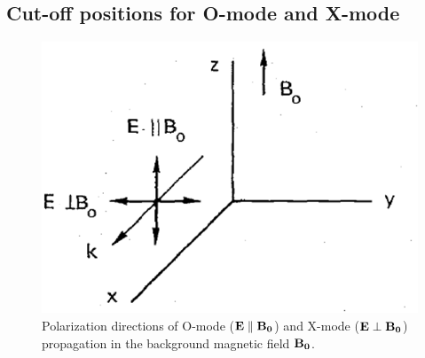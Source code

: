 \subsection{Cut-off positions for O-mode and X-mode}


\begin{figure}[h]
\begin{centering}
\includegraphics[scale=0.5]{polarization.png}
\par\end{centering}
\caption[Polarization directions of O-mode and X-mode]{Polarization directions of O-mode ($\boldsymbol{\mathrm{E}}\parallel\boldsymbol{\mathrm{B_0}}$) and X-mode ($\boldsymbol{\mathrm{E}}\perp\boldsymbol{\mathrm{B_0}}$) propagation in the background magnetic field $\boldsymbol{\mathrm{B_0}}$.}
\label{fig:polarization}
\end{figure}

